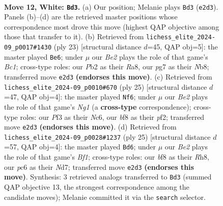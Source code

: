 \documentclass[11pt]{article}
\begin{document}
\clearpage

\begin{figure}[p]\centering
\begin{subfigure}{0.46\textwidth}\centering
\resizebox{\linewidth}{!}{%
\newchessgame
\chessboard[
  setfen={r1b1kb1r/p3nppp/2pp4/8/8/N4P2/PPP1B1PP/R1B1K2R w KQkq - 2 12},
  showmover=false,
  pgfstyle=straightmove, color=movearrow, markmove={e2-d3}
]}
\caption{}
\end{subfigure}\hfill
\begin{subfigure}{0.46\textwidth}\centering
\resizebox{\linewidth}{!}{%
\newchessgame
\chessboard[
  setfen={rnb1k2r/pp3ppp/2p5/4n3/8/P1P1P3/4BPPP/R1B1K1NR b kq - 1 12},
  showmover=false,
  pgfstyle=straightmove, color=movearrow, markmove={c8-e6}
]}
\caption{}
\end{subfigure}
\\[4pt]
\begin{subfigure}{0.46\textwidth}\centering
\resizebox{\linewidth}{!}{%
\newchessgame
\chessboard[
  setfen={r1b1k1nr/pp3ppp/2n5/8/8/5N2/PP1B1PPP/R3KB1R b KQkq - 0 13},
  showmover=false,
  pgfstyle=straightmove, color=movearrow, markmove={g8-f6}
]}
\caption{}
\end{subfigure}\hfill
\begin{subfigure}{0.46\textwidth}\centering
\resizebox{\linewidth}{!}{%
\newchessgame
\chessboard[
  setfen={r3kb1r/pp1n2pp/2p1p3/8/P3P3/8/1PP1K1PP/R1B1N2R b kq - 0 13},
  showmover=false,
  pgfstyle=straightmove, color=movearrow, markmove={f8-d6}
]}
\caption{}
\end{subfigure}
\caption{\textbf{Move 12, White: \texttt{Bd3}.} (a) Our position; Melanie plays \texttt{Bd3} (\texttt{e2d3}). Panels (b)--(d) are the retrieved master positions whose correspondence most drove this move (highest QAP objective among those that transfer to it). (b) Retrieved from \texttt{lichess\_elite\_2024-09\_p0017\#1430} (ply 23) [structural distance $d$=45, QAP obj=5]: the master played \texttt{Be6}; under $\mu$ our \emph{Be2} plays the role of that game's \emph{Bc1}; cross-type roles: our \emph{P}b2 as their \emph{R}a8, our \emph{p}g7 as their \emph{N}b8; transferred move \texttt{e2d3} \textbf{(endorses this move)}. (c) Retrieved from \texttt{lichess\_elite\_2024-09\_p0010\#670} (ply 25) [structural distance $d$=47, QAP obj=4]: the master played \texttt{Nf6}; under $\mu$ our \emph{Be2} plays the role of that game's \emph{Ng1} (a \textbf{cross-type} correspondence); cross-type roles: our \emph{P}f3 as their \emph{N}c6, our \emph{b}f8 as their \emph{p}f2; transferred move \texttt{e2d3} \textbf{(endorses this move)}. (d) Retrieved from \texttt{lichess\_elite\_2024-09\_p0028\#1237} (ply 25) [structural distance $d$=57, QAP obj=4]: the master played \texttt{Bd6}; under $\mu$ our \emph{Be2} plays the role of that game's \emph{Bf1}; cross-type roles: our \emph{b}f8 as their \emph{R}h8, our \emph{p}c6 as their \emph{N}d7; transferred move \texttt{e2d3} \textbf{(endorses this move)}. Synthesis: 3 retrieved analogs transferred to \texttt{Bd3} (summed QAP objective 13, the strongest correspondence among the candidate moves); Melanie committed it via the \texttt{search} selector.}
\label{fig:thought-m22}
\end{figure}
\end{document}
